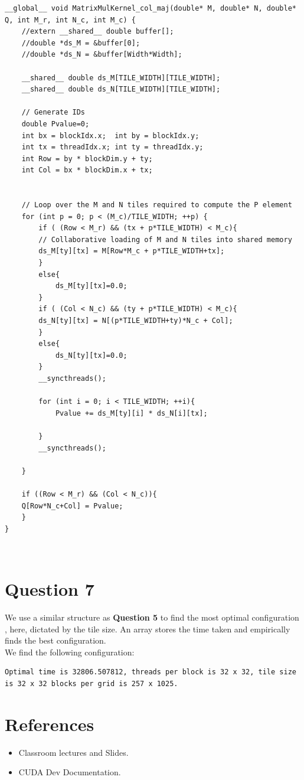 \begin{lstlisting}
__global__ void MatrixMulKernel_col_maj(double* M, double* N, double* Q, int M_r, int N_c, int M_c) { 
    //extern __shared__ double buffer[];
    //double *ds_M = &buffer[0];
    //double *ds_N = &buffer[Width*Width];

    __shared__ double ds_M[TILE_WIDTH][TILE_WIDTH];
    __shared__ double ds_N[TILE_WIDTH][TILE_WIDTH];

    // Generate IDs
    double Pvalue=0;
    int bx = blockIdx.x;  int by = blockIdx.y;
    int tx = threadIdx.x; int ty = threadIdx.y;
    int Row = by * blockDim.y + ty;
    int Col = bx * blockDim.x + tx;

    
    // Loop over the M and N tiles required to compute the P element
    for (int p = 0; p < (M_c)/TILE_WIDTH; ++p) {
        if ( (Row < M_r) && (tx + p*TILE_WIDTH) < M_c){
        // Collaborative loading of M and N tiles into shared memory
        ds_M[ty][tx] = M[Row*M_c + p*TILE_WIDTH+tx];
        }
        else{
            ds_M[ty][tx]=0.0;
        }
        if ( (Col < N_c) && (ty + p*TILE_WIDTH) < M_c){
        ds_N[ty][tx] = N[(p*TILE_WIDTH+ty)*N_c + Col];
        }
        else{
            ds_N[ty][tx]=0.0;
        }
        __syncthreads();

        for (int i = 0; i < TILE_WIDTH; ++i){
            Pvalue += ds_M[ty][i] * ds_N[i][tx];
            
        }
        __syncthreads();
        
    }
    
    if ((Row < M_r) && (Col < N_c)){
    Q[Row*N_c+Col] = Pvalue;
    }
}
\end{lstlisting} \\

\section{Question 7}

We use a similar structure as \textbf{Question 5} to find the most optimal configuration , here, dictated by the tile size. An array stores the time taken and empirically finds the best configuration.\\

We find the following configuration: \\

\begin{lstlisting}[numbers = none]
Optimal time is 32806.507812, threads per block is 32 x 32, tile size is 32 x 32 blocks per grid is 257 x 1025.
\end{lstlisting} 

\section{References}
\begin{itemize}
\item Classroom lectures and Slides.
\item CUDA Dev Documentation.
\end{itemize}

